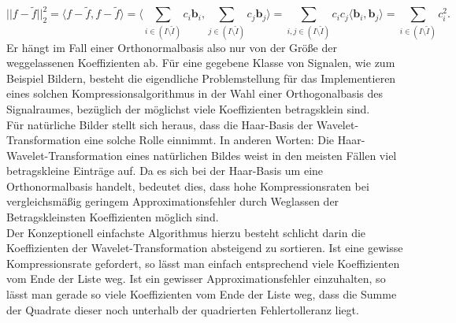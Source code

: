 %
\[
||f-\tilde{f}||_2^2 
= \langle f-\tilde{f}, f-\tilde{f} \rangle 
= \langle \sum_{i \in (I \setminus \tilde{I})} c_i \mathbf{b}_i , \sum_{j \in (I \setminus \tilde{I})} c_j \mathbf{b}_j \rangle 
= \sum_{i,j \in (I \setminus \tilde{I})} c_i c_j \langle \mathbf{b}_i , \mathbf{b}_j \rangle 
= \sum_{i \in (I \setminus \tilde{I})} c_i^2
.
\]
%
Er hängt im Fall einer Orthonormalbasis also nur von der Größe der weggelassenen Koeffizienten ab. Für eine gegebene Klasse von Signalen, wie zum Beispiel Bildern, besteht die eigendliche Problemstellung für das Implementieren eines solchen Kompressionsalgorithmus in der Wahl einer Orthogonalbasis des Signalraumes, bezüglich der möglichst viele Koeffizienten betragsklein sind.\\
Für natürliche Bilder stellt sich heraus, dass die Haar-Basis der Wavelet-Transformation eine solche Rolle einnimmt. In anderen Worten: Die Haar-Wavelet-Transformation eines natürlichen Bildes weist in den meisten Fällen viel betragskleine Einträge auf. Da es sich bei der Haar-Basis um eine Orthonormalbasis handelt, bedeutet dies, dass hohe Kompressionsraten bei vergleichsmäßig geringem Approximationsfehler durch Weglassen der Betragskleinsten Koeffizienten möglich sind. \\
Der Konzeptionell einfachste Algorithmus hierzu besteht schlicht darin die Koeffizienten der Wavelet-Transformation absteigend zu sortieren. Ist eine gewisse Kompressionsrate gefordert, so lässt man einfach entsprechend viele Koeffizienten vom Ende der Liste weg. Ist ein gewisser Approximationsfehler einzuhalten, so lässt man gerade so viele Koeffizienten vom Ende der Liste weg, dass die Summe der Quadrate dieser noch unterhalb der quadrierten Fehlertolleranz liegt.
%
%
%
%
%


